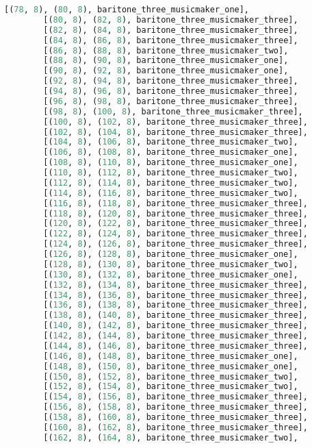 \begin{lstlisting}[language=Python, caption=Invocation Source Code]
        [(78, 8), (80, 8), baritone_three_musicmaker_one],
        [(80, 8), (82, 8), baritone_three_musicmaker_three],
        [(82, 8), (84, 8), baritone_three_musicmaker_three],
        [(84, 8), (86, 8), baritone_three_musicmaker_three],
        [(86, 8), (88, 8), baritone_three_musicmaker_two],
        [(88, 8), (90, 8), baritone_three_musicmaker_one],
        [(90, 8), (92, 8), baritone_three_musicmaker_one],
        [(92, 8), (94, 8), baritone_three_musicmaker_three],
        [(94, 8), (96, 8), baritone_three_musicmaker_three],
        [(96, 8), (98, 8), baritone_three_musicmaker_three],
        [(98, 8), (100, 8), baritone_three_musicmaker_three],
        [(100, 8), (102, 8), baritone_three_musicmaker_three],
        [(102, 8), (104, 8), baritone_three_musicmaker_three],
        [(104, 8), (106, 8), baritone_three_musicmaker_two],
        [(106, 8), (108, 8), baritone_three_musicmaker_one],
        [(108, 8), (110, 8), baritone_three_musicmaker_one],
        [(110, 8), (112, 8), baritone_three_musicmaker_two],
        [(112, 8), (114, 8), baritone_three_musicmaker_two],
        [(114, 8), (116, 8), baritone_three_musicmaker_two],
        [(116, 8), (118, 8), baritone_three_musicmaker_three],
        [(118, 8), (120, 8), baritone_three_musicmaker_three],
        [(120, 8), (122, 8), baritone_three_musicmaker_three],
        [(122, 8), (124, 8), baritone_three_musicmaker_three],
        [(124, 8), (126, 8), baritone_three_musicmaker_three],
        [(126, 8), (128, 8), baritone_three_musicmaker_one],
        [(128, 8), (130, 8), baritone_three_musicmaker_two],
        [(130, 8), (132, 8), baritone_three_musicmaker_one],
        [(132, 8), (134, 8), baritone_three_musicmaker_three],
        [(134, 8), (136, 8), baritone_three_musicmaker_three],
        [(136, 8), (138, 8), baritone_three_musicmaker_three],
        [(138, 8), (140, 8), baritone_three_musicmaker_three],
        [(140, 8), (142, 8), baritone_three_musicmaker_three],
        [(142, 8), (144, 8), baritone_three_musicmaker_three],
        [(144, 8), (146, 8), baritone_three_musicmaker_three],
        [(146, 8), (148, 8), baritone_three_musicmaker_one],
        [(148, 8), (150, 8), baritone_three_musicmaker_one],
        [(150, 8), (152, 8), baritone_three_musicmaker_two],
        [(152, 8), (154, 8), baritone_three_musicmaker_two],
        [(154, 8), (156, 8), baritone_three_musicmaker_three],
        [(156, 8), (158, 8), baritone_three_musicmaker_three],
        [(158, 8), (160, 8), baritone_three_musicmaker_three],
        [(160, 8), (162, 8), baritone_three_musicmaker_three],
        [(162, 8), (164, 8), baritone_three_musicmaker_two],

\end{lstlisting}
